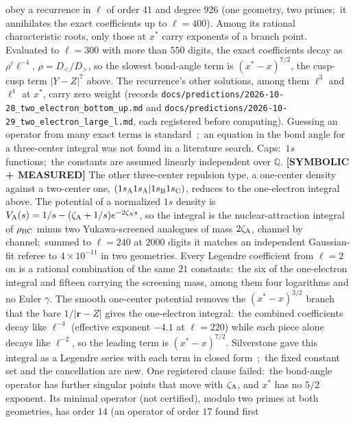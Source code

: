 \documentclass[aps,pra,twocolumn,superscriptaddress,longbibliography]{revtex4-2}
\begin{document}
obey a recurrence in $\ell$ of order $41$ and degree $926$ (one geometry, two primes;\ it
annihilates the exact coefficients up to $\ell=400$).  Among its rational characteristic roots,
only those at $x^{*}$ carry exponents of a branch point.  Evaluated to $\ell=300$ with more than
$550$ digits, the exact coefficients decay as $\rho^{\ell}\ell^{-4}$, $\rho=D_</D_>$, so the
slowest bond-angle term is $(x^{*}-x)^{7/2}$, the cusp-cusp term $|Y-Z|^{7}$ above.  The
recurrence's other solutions, among them $\ell^{3}$ and $\ell^{1}$ at $x^{*}$, carry zero weight
(records \texttt{docs/predictions/2026-10-28\_two\_electron\_bottom\_up.md} and
\texttt{docs/predictions/2026-10-29\_two\_electron\_large\_l.md}, each registered before
computing).
Guessing an operator from many exact terms is standard~\cite{bluemlein2009moments,bostan2009chi5};\ an
equation in the bond angle for a three-center integral was not found in a literature search.
Caps:\ $1s$ functions;\ the constants are assumed linearly independent over $\mathbb{Q}$.
\textbf{[SYMBOLIC + MEASURED]} The other three-center repulsion type, a one-center density
against a two-center one, $(1s_{\rm A}1s_{\rm A}|1s_{\rm B}1s_{\rm C})$, reduces to the
one-electron integral above.  The potential of a normalized $1s$ density is
$V_{\rm A}(s)=1/s-(\zeta_{\rm A}+1/s)e^{-2\zeta_{\rm A}s}$, so the integral is the
nuclear-attraction integral of $\rho_{\rm BC}$ minus two Yukawa-screened analogues of mass
$2\zeta_{\rm A}$, channel by channel;\ summed to $\ell=240$ at $2000$ digits it matches an
independent Gaussian-fit referee to $4\times10^{-11}$ in two geometries.  Every Legendre
coefficient from $\ell=2$ on is a rational combination of the same $21$ constants:\ the
six of the one-electron integral and fifteen carrying the screening mass, among them
four logarithms and no Euler $\gamma$.  The smooth one-center potential removes the
$(x^{*}-x)^{3/2}$ branch that the bare $1/|\mathbf{r}-Z|$ gives the one-electron
integral:\ the combined coefficients decay like $\ell^{-4}$ (effective exponent $-4.1$ at
$\ell=220$) while each piece alone decays like $\ell^{-2}$, so the leading term is
$(x^{*}-x)^{7/2}$.  Silverstone gave this integral as a Legendre series with each term in
closed form~\cite{silverstone1967pnas};\ the fixed constant set and the cancellation are
new.  One registered clause failed:\ the bond-angle operator has further singular points
that move with $\zeta_{\rm A}$, and $x^{*}$ has no $5/2$ exponent.  Its minimal operator (not certified),
modulo two primes at both geometries, has order $14$ (an operator of order $17$ found first
\end{document}
